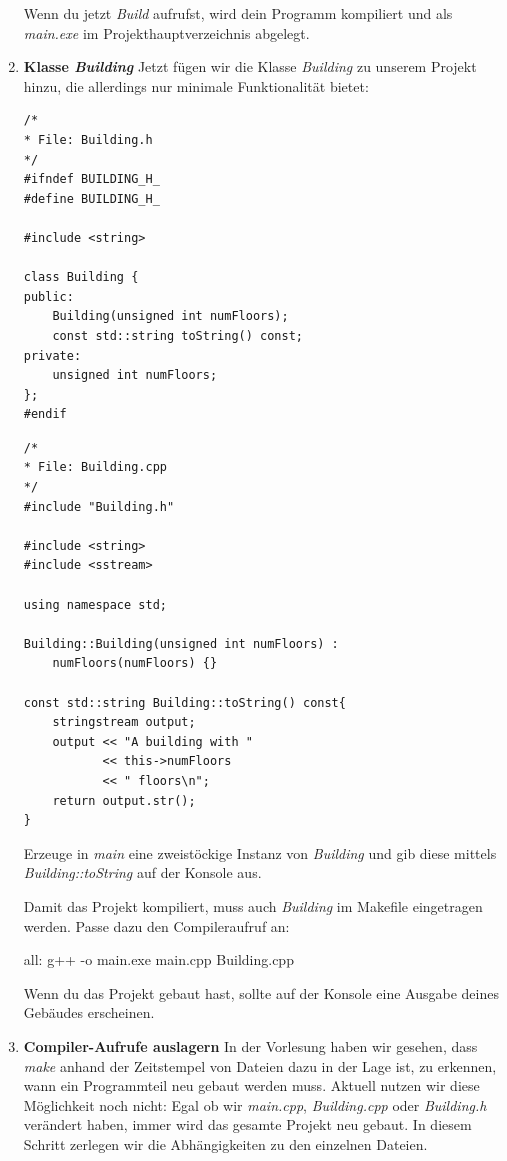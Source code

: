 \begin{enumerate}
Wenn du jetzt \emph{Build} aufrufst, wird dein Programm kompiliert und als \emph{main.exe} im Projekthauptverzeichnis abgelegt.

\item\textbf{Klasse \emph{Building}}
Jetzt fügen wir die Klasse \emph{Building} zu unserem Projekt hinzu, die allerdings nur minimale Funktionalität bietet:

\begin{minipage}[t]{.45\textwidth}
\begin{lstlisting}
/*
* File: Building.h
*/
#ifndef BUILDING_H_
#define BUILDING_H_

#include <string>

class Building {
public:
    Building(unsigned int numFloors);
    const std::string toString() const;
private:
    unsigned int numFloors;
};
#endif
\end{lstlisting}
\end{minipage}
\begin{minipage}[t]{.45\textwidth}
\begin{lstlisting}
/*
* File: Building.cpp
*/
#include "Building.h"

#include <string>
#include <sstream>

using namespace std;

Building::Building(unsigned int numFloors) :
    numFloors(numFloors) {}

const std::string Building::toString() const{
    stringstream output;
    output << "A building with " 
           << this->numFloors 
           << " floors\n";
    return output.str();
}
\end{lstlisting}
\end{minipage}

Erzeuge in \emph{main} eine zweistöckige Instanz von \emph{Building} und gib diese mittels \emph{Building::toString} auf der Konsole aus.

Damit das Projekt kompiliert, muss auch \emph{Building} im Makefile eingetragen werden.
Passe dazu den Compileraufruf an:
\begin{lstmake}
all:
    g++ -o main.exe main.cpp Building.cpp
\end{lstmake}

Wenn du das Projekt gebaut hast, sollte auf der Konsole eine Ausgabe deines Gebäudes erscheinen.

\item\textbf{Compiler-Aufrufe auslagern}
In der Vorlesung haben wir gesehen, dass \emph{make} anhand der Zeitstempel von Dateien dazu in der Lage ist, zu erkennen, wann ein Programmteil neu gebaut werden muss.
Aktuell nutzen wir diese Möglichkeit noch nicht:
Egal ob wir \emph{main.cpp}, \emph{Building.cpp} oder \emph{Building.h} verändert haben, immer wird das gesamte Projekt neu gebaut.
In diesem Schritt zerlegen wir die Abhängigkeiten zu den einzelnen Dateien.


\end{enumerate}
